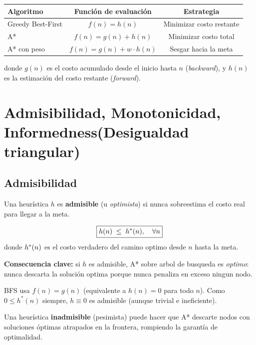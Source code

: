 \begin{center}
\begin{tabular}{lcc}
  \toprule
  \textbf{Algoritmo} & \textbf{Función de evaluación} & \textbf{Estrategia} \\
  \midrule
  Greedy Best-First & $f(n) = h(n)$          & Minimizar costo restante \\
  A*               & $f(n) = g(n) + h(n)$   & Minimizar costo total    \\
  A* con peso      & $f(n) = g(n) + w \cdot h(n)$ & Sesgar hacia la meta \\
  \bottomrule
\end{tabular}
\end{center}
 
donde $g(n)$ es el costo acumulado desde el inicio hasta $n$
(\emph{backward}), y $h(n)$ es la estimación del costo restante
(\emph{forward}).

\section{Admisibilidad, Monotonicidad, Informedness(Desigualdad triangular)}

\subsection{Admisibilidad}
\begin{definition}[Admisibilidad]
Una heurística $h$ es \textbf{admisible} (u \emph{optimista}) si nunca sobreestima el costo real para llegar a la meta.

\[
  \boxed{h(n) \;\leq\; h^*(n), \quad \forall n}
\]
donde  $h^*(n)$ es el costo verdadero del camino optimo desde $n$ hasta la meta.
\end{definition}

\textbf{Consecuencia clave:} si $h$ es admisible, A* sobre arbol de busqueda es \emph{optimo}: nunca descarta la solución optima porque nunca penaliza en exceso ningun nodo.

\begin{example}
BFS usa $f(n) = g(n)$ (equivalente a $h(n) = 0$ para todo $n$). Como
$0 \leq h^*(n)$ siempre, $h \equiv 0$ es admisible (aunque trivial e
ineficiente).
\end{example}

\begin{theorem}
Una heurística \textbf{inadmisible} (pesimista) puede hacer que A* descarte nodos con soluciones óptimas atrapados en la frontera, rompiendo la garantía de optimalidad.
\end{theorem}

